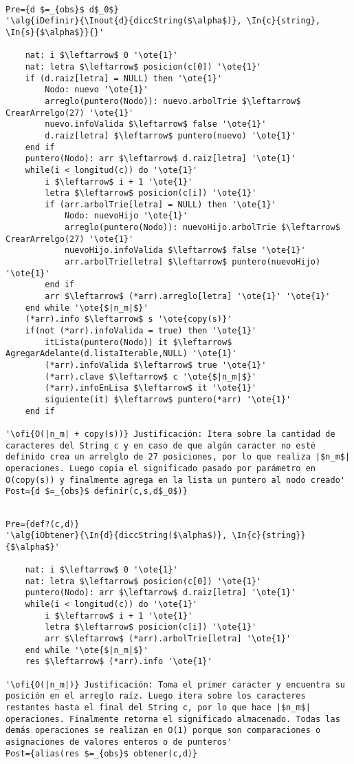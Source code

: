 \begin{lstlisting}[mathescape]

Pre={d $=_{obs}$ d$_0$}
'\alg{iDefinir}{\Inout{d}{diccString($\alpha$)}, \In{c}{string}, \In{s}{$\alpha$}}{}'

	nat: i $\leftarrow$ 0 '\ote{1}'
	nat: letra $\leftarrow$ posicion(c[0]) '\ote{1}'
	if (d.raiz[letra] = NULL) then '\ote{1}'
		Nodo: nuevo '\ote{1}'
		arreglo(puntero(Nodo)): nuevo.arbolTrie $\leftarrow$ CrearArrelgo(27) '\ote{1}'
		nuevo.infoValida $\leftarrow$ false '\ote{1}'
		d.raiz[letra] $\leftarrow$ puntero(nuevo) '\ote{1}'
	end if
	puntero(Nodo): arr $\leftarrow$ d.raiz[letra] '\ote{1}'
	while(i < longitud(c)) do '\ote{1}'
		i $\leftarrow$ i + 1 '\ote{1}'
		letra $\leftarrow$ posicion(c[i]) '\ote{1}'
		if (arr.arbolTrie[letra] = NULL) then '\ote{1}'
			Nodo: nuevoHijo '\ote{1}'
			arreglo(puntero(Nodo)): nuevoHijo.arbolTrie $\leftarrow$ CrearArrelgo(27) '\ote{1}'
			nuevoHijo.infoValida $\leftarrow$ false '\ote{1}'
			arr.arbolTrie[letra] $\leftarrow$ puntero(nuevoHijo) '\ote{1}'	
		end if			
		arr $\leftarrow$ (*arr).arreglo[letra] '\ote{1}' '\ote{1}'
	end while '\ote{$|n_m|$}'
    (*arr).info $\leftarrow$ s '\ote{copy(s)}'
    if(not (*arr).infoValida = true) then '\ote{1}'
    	itLista(puntero(Nodo)) it $\leftarrow$ AgregarAdelante(d.listaIterable,NULL) '\ote{1}'
    	(*arr).infoValida $\leftarrow$ true '\ote{1}'
    	(*arr).clave $\leftarrow$ c '\ote{$|n_m|$}'
    	(*arr).infoEnLisa $\leftarrow$ it '\ote{1}'
    	siguiente(it) $\leftarrow$ puntero(*arr) '\ote{1}'
    end if
    	
'\ofi{O(|n_m| + copy(s))} Justificación: Itera sobre la cantidad de caracteres del String c y en caso de que algún caracter no esté definido crea un arrelglo de 27 posiciones, por lo que realiza |$n_m$| operaciones. Luego copia el significado pasado por parámetro en O(copy(s)) y finalmente agrega en la lista un puntero al nodo creado'
Post={d $=_{obs}$ definir(c,s,d$_0$)}
\end{lstlisting}

\begin{lstlisting}[mathescape]

Pre={def?(c,d)}
'\alg{iObtener}{\In{d}{diccString($\alpha$)}, \In{c}{string}}{$\alpha$}'

	nat: i $\leftarrow$ 0 '\ote{1}'
	nat: letra $\leftarrow$ posicion(c[0]) '\ote{1}'
	puntero(Nodo): arr $\leftarrow$ d.raiz[letra] '\ote{1}'
	while(i < longitud(c)) do '\ote{1}'
		i $\leftarrow$ i + 1 '\ote{1}'
		letra $\leftarrow$ posicion(c[i]) '\ote{1}'
		arr $\leftarrow$ (*arr).arbolTrie[letra] '\ote{1}'
	end while '\ote{$|n_m|$}'
	res $\leftarrow$ (*arr).info '\ote{1}'
	
'\ofi{O(|n_m|)} Justificación: Toma el primer caracter y encuentra su posición en el arreglo raíz. Luego itera sobre los caracteres restantes hasta el final del String c, por lo que hace |$n_m$| operaciones. Finalmente retorna el significado almacenado. Todas las demás operaciones se realizan en O(1) porque son comparaciones o asignaciones de valores enteros o de punteros'
Post={alias(res $=_{obs}$ obtener(c,d)}

\end{lstlisting}

